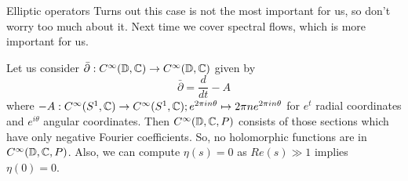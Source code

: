\begin{clear}{Elliptic operators}
 Turns out this case is not the most important for us, so don't worry too much about it. Next time we cover spectral flows, which is more important for us.


\begin{example}
Let us consider $\bar{\partial}: C^\infty (\mathbb{D}, \mathbb{C}) \to C^\infty (\mathbb{D}, \mathbb{C})$ given by $$\bar{\partial} = \frac{d}{dt} - A$$ where $-A: C^\infty(S^1, \mathbb{C}) \to  C^\infty(S^1, \mathbb{C}); e^{2\pi i n\theta} \mapsto 2 \pi n e^{2\pi i n\theta}$  for $e^t$ radial coordinates and $e^{i\theta}$ angular coordinates.
Then  $C^\infty (\mathbb{D}, \mathbb{C}, P)$ consists of those sections which have only negative Fourier coefficients. So, no holomorphic functions are in $C^\infty (\mathbb{D}, \mathbb{C}, P)$. Also, we can compute $\eta(s) = 0$ as $Re(s) \gg 1$ implies $\eta(0) = 0$.

\end{example}

\end{clear}





